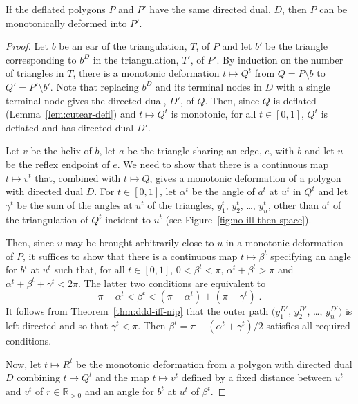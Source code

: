 \documentclass{patmorin}
\newcommand{\R}[0]{\mathds{R}}
\begin{document}

\begin{theorem}
  \label{thm:defl-dd-eq}
  If the deflated polygons $P$ and $P'$ have the same directed dual,
  $D$, then $P$ can be monotonically deformed into $P'$.
\end{theorem}
\begin{proof}
  Let $b$ be an ear of the triangulation, $T$, of $P$ and let $b'$ be
  the triangle corresponding to $b^D$ in the triangulation, $T'$, of
  $P'$.  By induction on the number of triangles in $T$, there is a
  monotonic deformation $t\mapsto Q^t$ from $Q = P\setminus b$ to $Q'
  = P'\setminus b'$.  Note that replacing $b^D$ and its terminal nodes
  in $D$ with a single terminal node gives the directed dual, $D'$, of
  $Q$.  Then, since $Q$ is deflated (Lemma~\ref{lem:cutear-defl}) and
  $t\mapsto Q^t$ is monotonic, for all $t\in [0,1]$, $Q^t$ is deflated
  and has directed dual $D'$.
  
  Let $v$ be the helix of $b$, let $a$ be the triangle sharing an
  edge, $e$, with $b$ and let $u$ be the reflex endpoint of $e$.  We
  need to show that there is a continuous map $t\mapsto v^t$ that,
  combined with $t\mapsto Q$, gives a monotonic deformation of a
  polygon with directed dual $D$.  For $t\in [0,1]$, let $\alpha^t$ be
  the angle of $a^t$ at $u^t$ in $Q^t$ and let $\gamma^t$ be the sum
  of the angles at $u^t$ of the triangles, $y_1^t$, $y_2^t$, \ldots,
  $y_n^t$, other than $a^t$ of the triangulation of $Q^t$ incident to
  $u^t$ (see Figure~\ref{fig:no-ill-then-space}).
  
  Then, since $v$ may be brought arbitrarily close to $u$ in a
  monotonic deformation of $P$, it suffices to show that there is a
  continuous map $t\mapsto \beta^t$ specifying an angle for $b^t$ at
  $u^t$ such that, for all $t\in [0,1]$, $0 < \beta^t < \pi$,
  $\alpha^t + \beta^t > \pi$ and $\alpha^t + \beta^t + \gamma^t <
  2\pi$.  The latter two conditions are equivalent to
  \[
    \pi - \alpha^t < \beta^t < (\pi - \alpha^t) + (\pi - \gamma^t)\;.
  \]
  It follows from Theorem~\ref{thm:ddd-iff-nip} that the outer path
  $(y_1^{D'}$, $y_2^{D'}$, \ldots, $y_n^{D'})$ is left-directed and so
  that $\gamma^t < \pi$.  Then $\beta^t = \pi - (\alpha^t
  + \gamma^t)/2$ satisfies all required conditions.
  
  Now, let $t\mapsto R^t$ be the monotonic deformation from a polygon
  with directed dual $D$ combining $t\mapsto Q^t$ and the map
  $t\mapsto v^t$ defined by a fixed distance between $u^t$ and $v^t$
  of $r\in\R_{>0}$ and an angle for $b^t$ at $u^t$ of
  $\beta^t$.
  

\end{proof}
\end{document}
